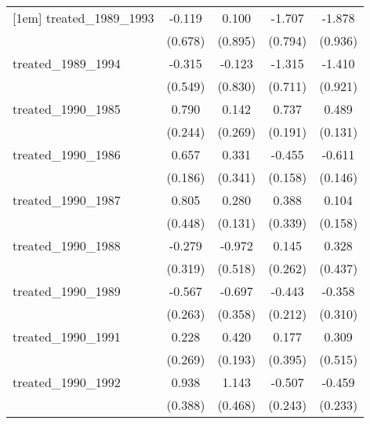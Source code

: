 {\begin{tabular}{l*{4}{c}}
[1em]
treated\_1989\_1993&      -0.119         &       0.100         &      -1.707\sym{*}  &      -1.878\sym{*}  \\
            &     (0.678)         &     (0.895)         &     (0.794)         &     (0.936)         \\
[1em]
treated\_1989\_1994&      -0.315         &      -0.123         &      -1.315         &      -1.410         \\
            &     (0.549)         &     (0.830)         &     (0.711)         &     (0.921)         \\
[1em]
treated\_1990\_1985&       0.790\sym{**} &       0.142         &       0.737\sym{***}&       0.489\sym{***}\\
            &     (0.244)         &     (0.269)         &     (0.191)         &     (0.131)         \\
[1em]
treated\_1990\_1986&       0.657\sym{***}&       0.331         &      -0.455\sym{**} &      -0.611\sym{***}\\
            &     (0.186)         &     (0.341)         &     (0.158)         &     (0.146)         \\
[1em]
treated\_1990\_1987&       0.805         &       0.280\sym{*}  &       0.388         &       0.104         \\
            &     (0.448)         &     (0.131)         &     (0.339)         &     (0.158)         \\
[1em]
treated\_1990\_1988&      -0.279         &      -0.972         &       0.145         &       0.328         \\
            &     (0.319)         &     (0.518)         &     (0.262)         &     (0.437)         \\
[1em]
treated\_1990\_1989&      -0.567\sym{*}  &      -0.697         &      -0.443\sym{*}  &      -0.358         \\
            &     (0.263)         &     (0.358)         &     (0.212)         &     (0.310)         \\
[1em]
treated\_1990\_1991&       0.228         &       0.420\sym{*}  &       0.177         &       0.309         \\
            &     (0.269)         &     (0.193)         &     (0.395)         &     (0.515)         \\
[1em]
treated\_1990\_1992&       0.938\sym{*}  &       1.143\sym{*}  &      -0.507\sym{*}  &      -0.459\sym{*}  \\
            &     (0.388)         &     (0.468)         &     (0.243)         &     (0.233)         \\

\end{tabular}}
